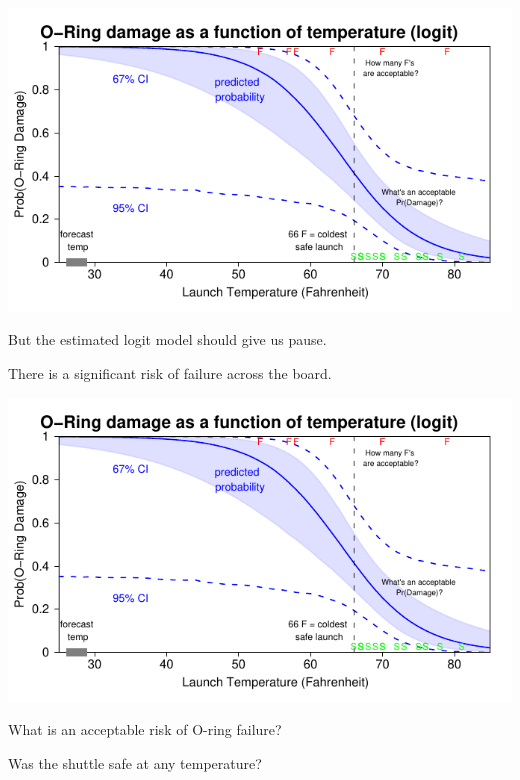 \documentclass[pdflatex,landscape,titlepage]{foils}
\begin{document}
\color{black}
\begin{center}
\includegraphics[width=10.5 in]{chall6}
\end{center}

\vspace{-2 em}

But the estimated logit model should give us pause.  

There is a significant risk of failure across the board.

\foilhead[-0.75in]{}

\color{black}
\begin{center}
\includegraphics[width=10.5 in]{chall6}
\end{center}

\vspace{-2 em}

What is an acceptable risk of O-ring failure?  

Was the shuttle safe at any temperature?


\foilhead[-0.75in]{}
\bgclear
\end{document}
